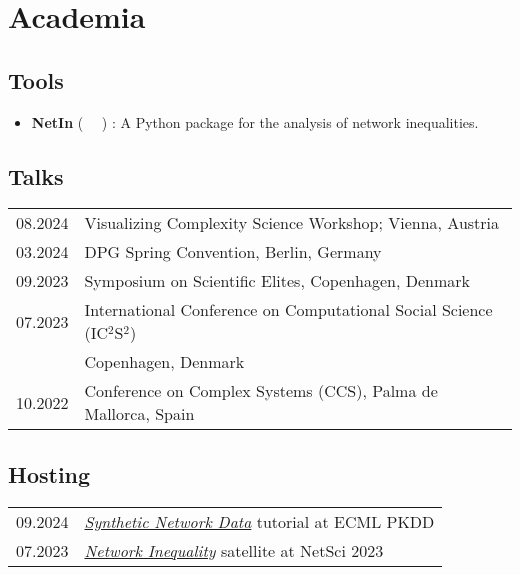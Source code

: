 \documentclass[11pt]{article} %
\begin{document}
\section*{Academia}
\label{academia}

\subsection*{Tools}
%
\begin{itemize}
    \item \textbf{NetIn} (~\href{https://pypi.org/project/netin/}{\faPython}
        \hspace{0.5em}\href{https://github.com/CSHVienna/NetworkInequalities}{\faGithub}
        \hspace{0.5em}\href{https://cshvienna.github.io/NetworkInequalities/}{\faFile*[regular]}~)
        : A Python package for the analysis of network inequalities.

\end{itemize}

\subsection*{Talks}
\begin{longtable}[l]{@{}p{} p{}}
  08.2024     & Visualizing Complexity Science Workshop; Vienna, Austria\\
  03.2024     & DPG Spring Convention, Berlin, Germany\\
  09.2023     & Symposium on Scientific Elites, Copenhagen, Denmark\\
  07.2023     & International Conference on Computational Social Science (IC$^2$S$^2$)\\
              & Copenhagen, Denmark\\
  10.2022     & Conference on Complex Systems (CCS), Palma de Mallorca, Spain
\end{longtable}

\subsection*{Hosting}
\label{hosting}
\begin{longtable}[l]{@{}p{} p{}}
  09.2024     & \href{https://sites.google.com/view/snma-tutorial/2024}{\emph{Synthetic Network Data}} tutorial at ECML PKDD\\
  07.2023     & \href{https://sites.google.com/view/netin-satellite-2023/home}{\emph{Network Inequality}} satellite at NetSci 2023\\
\end{longtable}
\end{document}

